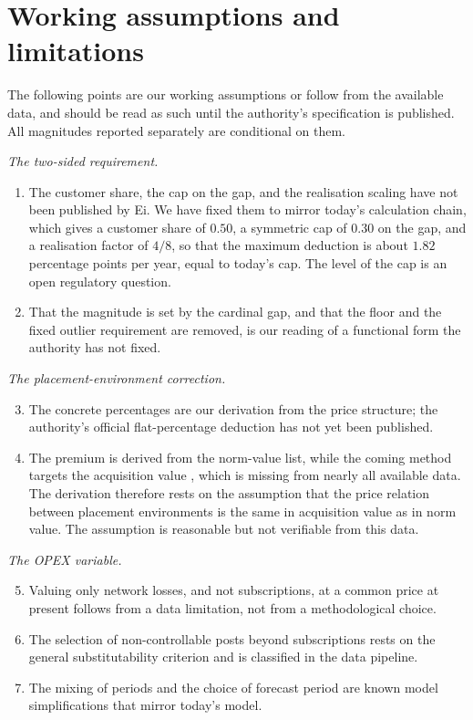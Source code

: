 \section{Working assumptions and limitations}
\label{sec:caveats}

The following points are our working assumptions or follow from the available data, and should be
read as such until the authority's specification is published. All magnitudes reported separately
are conditional on them.

\textit{The two-sided requirement.}
\begin{enumerate}
  \item The customer share, the cap on the gap, and the realisation scaling have not been published
    by Ei. We have fixed them to mirror today's calculation chain, which gives a customer share of
    $0.50$, a symmetric cap of $0.30$ on the gap, and a realisation factor of $4/8$, so that the
    maximum deduction is about $1.82$ percentage points per year, equal to today's cap. The level
    of the cap is an open regulatory question.
  \item That the magnitude is set by the cardinal gap, and that the floor and the fixed outlier
    requirement are removed, is our reading of a functional form the authority has not fixed.
\end{enumerate}

\textit{The placement-environment correction.}
\begin{enumerate}\setcounter{enumi}{2}
  \item The concrete percentages are our derivation from the price structure; the authority's
    official flat-percentage deduction has not yet been published.
  \item The premium is derived from the norm-value list, while the coming method targets the
    acquisition value \citep{Ei2025Inriktning}, which is missing from nearly all available data. The
    derivation therefore rests on the assumption that the price relation between placement
    environments is the same in acquisition value as in norm value. The assumption is reasonable but
    not verifiable from this data.
\end{enumerate}

\textit{The OPEX variable.}
\begin{enumerate}\setcounter{enumi}{4}
  \item Valuing only network losses, and not subscriptions, at a common price at present follows from
    a data limitation, not from a methodological choice.
  \item The selection of non-controllable posts beyond subscriptions rests on the general
    substitutability criterion and is classified in the data pipeline.
  \item The mixing of periods and the choice of forecast period are known model simplifications that
    mirror today's model.
\end{enumerate}

